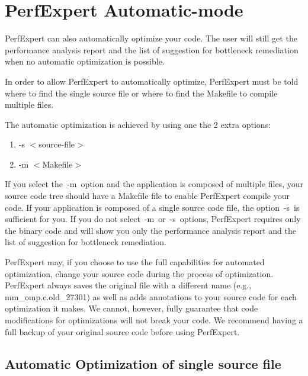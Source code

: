 \section{PerfExpert Automatic-mode}
\label{sec:PerfExpert_Automatic_Mode}


PerfExpert can also automatically optimize your code. The user will still get the performance analysis report and the list of suggestion for bottleneck remediation when no automatic optimization is possible.

In order to allow PerfExpert to automatically optimize, PerfExpert must be told where to find the single source file or where to find the Makefile to compile multiple files.

The automatic optimization is achieved by using one the 2 extra options:

\begin{enumerate}
  \item  -s  $<$source-file$>$
  \item  -m  $<$Makefile$>$
\end{enumerate}

If you select the~-m~option and the application is composed of multiple files, your source code tree should have a Makefile file to enable PerfExpert compile your code. If your application is composed of a single source code file, the option~-s~is sufficient for you. If you do not select~-m~or~-s~options, PerfExpert requires only the binary code and will show you only the performance analysis report and the list of suggestion for bottleneck remediation.

 PerfExpert may, if you choose to use the full capabilities for automated optimization, change your source code during the process of optimization. PerfExpert always saves the original file with a different name (e.g., mm_omp.c.old\_27301) as well as adds annotations to your source code for each optimization it makes. We cannot, however, fully guarantee that code modifications for optimizations will not break your code. We recommend having a full backup of your original source code before using PerfExpert.

\subsection{Automatic Optimization of single source file}
\label{subsec:Automatic_Optimization}

